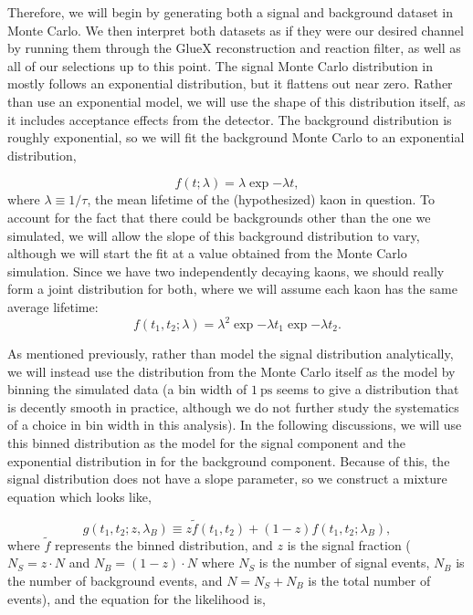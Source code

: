 Therefore, we will begin by generating both a signal and background dataset in Monte Carlo. We then interpret both datasets as if they were our desired channel by running them through the GlueX reconstruction and reaction filter, as well as all of our selections up to this point. The signal Monte Carlo distribution in  mostly follows an exponential distribution, but it flattens out near zero. Rather than use an exponential model, we will use the shape of this distribution itself, as it includes acceptance effects from the detector. The background distribution is roughly exponential, so we will fit the background Monte Carlo to an exponential distribution,

\begin{equation}
  f(t; \lambda) = \lambda \exp{-\lambda t},
  \label{eq:splot-exponential}
\end{equation}
where $\lambda \equiv 1/\tau$, the mean lifetime of the (hypothesized) kaon in question. To account for the fact that there could be backgrounds other than the one we simulated, we will allow the slope of this background distribution to vary, although we will start the fit at a value obtained from the Monte Carlo simulation. Since we have two independently decaying kaons, we should really form a joint distribution for both, where we will assume each kaon has the same average lifetime:
\begin{equation}
  f(t_1, t_2; \lambda) = \lambda^2 \exp{-\lambda t_1}\exp{-\lambda t_2}.
  \label{eq:splot-exponential_joint}
\end{equation}

As mentioned previously, rather than model the signal distribution analytically, we will instead use the distribution from the Monte Carlo itself as the model by binning the simulated data (a bin width of $\SI{1}{\pico\second}$ seems to give a distribution that is decently smooth in practice, although we do not further study the systematics of a choice in bin width in this analysis). In the following discussions, we will use this binned distribution as the model for the signal component and the exponential distribution in  for the background component. Because of this, the signal distribution does not have a slope parameter, so we construct a mixture equation which looks like,

\begin{equation}
  g(t_1, t_2; z, \lambda_B) \equiv z \tilde{f}(t_1, t_2) + (1-z) f(t_1, t_2; \lambda_B),
  \label{eq:splot-mixture}
\end{equation}
where $\tilde{f}$ represents the binned distribution, and $z$ is the signal fraction ($N_S = z\cdot N$ and $N_B = (1-z)\cdot N$ where $N_S$ is the number of signal events, $N_B$ is the number of background events, and $N = N_S + N_B$ is the total number of events), and the equation for the likelihood is,


